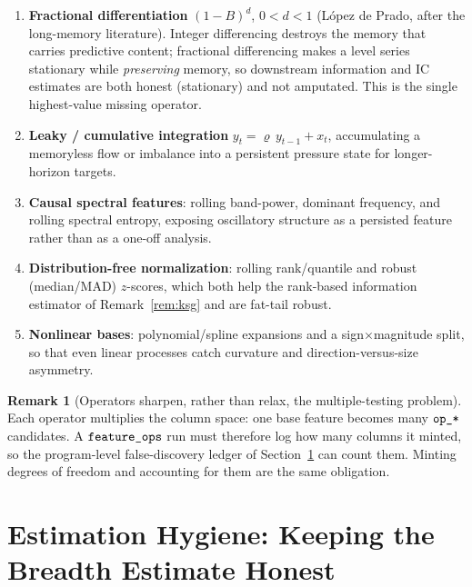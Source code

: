 \documentclass[11pt,a4paper]{article}
\theoremstyle{definition}
\newtheorem{remark}{Remark}[section]
\theoremstyle{plain}
\newcommand{\code}[1]{\texttt{\detokenize{#1}}}
\begin{document}
\begin{enumerate}
  \item \textbf{Fractional differentiation} $(1-B)^{d}$, $0<d<1$ (L\'opez de Prado, after the long-memory
        literature). Integer differencing destroys the memory that carries predictive content;
        fractional differencing makes a level series stationary while \emph{preserving} memory,
        so downstream information and IC estimates are both honest (stationary) and not amputated.
        This is the single highest-value missing operator.
  \item \textbf{Leaky / cumulative integration} $y_t = \varrho\,y_{t-1} + x_t$, accumulating a
        memoryless flow or imbalance into a persistent pressure state for longer-horizon targets.
  \item \textbf{Causal spectral features}: rolling band-power, dominant frequency, and rolling
        spectral entropy, exposing oscillatory structure as a persisted feature rather than as a
        one-off analysis.
  \item \textbf{Distribution-free normalization}: rolling rank/quantile and robust (median/MAD)
        $z$-scores, which both help the rank-based information estimator of
        Remark~\ref{rem:ksg} and are fat-tail robust.
  \item \textbf{Nonlinear bases}: polynomial/spline expansions and a sign$\times$magnitude split, so
        that even linear processes catch curvature and direction-versus-size asymmetry.
\end{enumerate}

\begin{remark}[Operators sharpen, rather than relax, the multiple-testing problem]
\label{rem:ledger-ops}
Each operator multiplies the column space: one base feature becomes many $\code{op_*}$ candidates.
A $\code{feature_ops}$ run must therefore log how many columns it minted, so the program-level
false-discovery ledger of Section~\ref{sec:hygiene} can count them. Minting degrees of freedom and
accounting for them are the same obligation.
\end{remark}

\section{Estimation Hygiene: Keeping the Breadth Estimate Honest}
\label{sec:hygiene}
\end{document}

